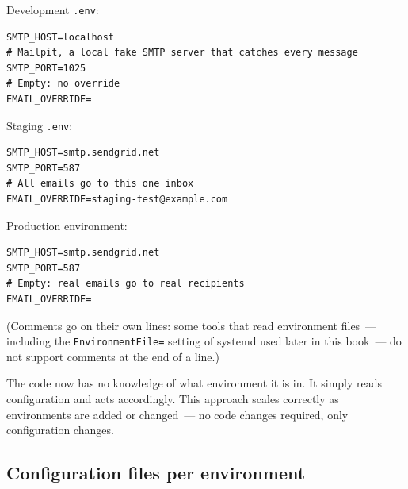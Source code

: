 \noindent{}Development \texttt{.env}:

\begin{outputbox}[short]
\begin{Verbatim}[fontsize=\codesize, breaklines, breakanywhere, breaksymbolleft={\tiny\textcolor{muted}{$\hookrightarrow$}}]
SMTP_HOST=localhost
# Mailpit, a local fake SMTP server that catches every message
SMTP_PORT=1025
# Empty: no override
EMAIL_OVERRIDE=
\end{Verbatim}
\end{outputbox}

\noindent{}Staging \texttt{.env}:

\begin{outputbox}[short]
\begin{Verbatim}[fontsize=\codesize, breaklines, breakanywhere, breaksymbolleft={\tiny\textcolor{muted}{$\hookrightarrow$}}]
SMTP_HOST=smtp.sendgrid.net
SMTP_PORT=587
# All emails go to this one inbox
EMAIL_OVERRIDE=staging-test@example.com
\end{Verbatim}
\end{outputbox}

\noindent{}Production environment:

\begin{outputbox}[short]
\begin{Verbatim}[fontsize=\codesize, breaklines, breakanywhere, breaksymbolleft={\tiny\textcolor{muted}{$\hookrightarrow$}}]
SMTP_HOST=smtp.sendgrid.net
SMTP_PORT=587
# Empty: real emails go to real recipients
EMAIL_OVERRIDE=
\end{Verbatim}
\end{outputbox}

\noindent{}(Comments go on their own lines: some tools that read environment files~--- including the \texttt{EnvironmentFile=} setting of systemd used later in this book~--- do not support comments at the end of a line.)

The code now has no knowledge of what environment it is in. It simply reads configuration and acts accordingly. This approach scales correctly as environments are added or changed~--- no code changes required, only configuration changes.

\subsection*{Configuration files per environment}\label{09-configuration-coupling:configuration-files-per-environment}

